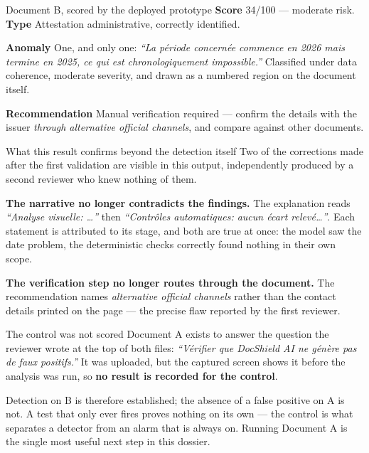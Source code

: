 \documentclass[10pt,a4paper]{article}
\newcommand{\heading}[2]{%
  \par\vspace{8pt}{\color{navy}\bfseries #1\hspace{6pt}#2}\par\vspace{-3pt}}
\newcommand{\fld}[1]{\textbf{\color{navy}#1}\hspace{5pt}}
\begin{document}
\newpage
\heading{4.2}{The result --- the planted defect was caught}

\vspace{2pt}
\begin{goodbox}{Document B, scored by the deployed prototype}
\fld{Score} 34/100 --- moderate risk. \fld{Type} Attestation administrative,
correctly identified.

\vspace{3pt}
\fld{Anomaly} One, and only one: \emph{``La période concernée commence en 2026
mais termine en 2025, ce qui est chronologiquement impossible.''} Classified
under data coherence, moderate severity, and drawn as a numbered region on the
document itself.

\vspace{3pt}
\fld{Recommendation} Manual verification required --- confirm the details with
the issuer \emph{through alternative official channels}, and compare against
other documents.
\end{goodbox}

\vspace{4pt}
\begin{note}{What this result confirms beyond the detection itself}
Two of the corrections made after the first validation are visible in this
output, independently produced by a second reviewer who knew nothing of them.

\vspace{3pt}
\textbf{The narrative no longer contradicts the findings.} The explanation reads
\emph{``Analyse visuelle: …''} then \emph{``Contrôles automatiques: aucun écart
relevé…''}. Each statement is attributed to its stage, and both are true at
once: the model saw the date problem, the deterministic checks correctly found
nothing in their own scope.

\vspace{3pt}
\textbf{The verification step no longer routes through the document.} The
recommendation names \emph{alternative official channels} rather than the
contact details printed on the page --- the precise flaw reported by the first
reviewer.
\end{note}

\vspace{4pt}
\begin{badbox}{The control was not scored}
Document A exists to answer the question the reviewer wrote at the top of both
files: \emph{``Vérifier que DocShield AI ne génère pas de faux positifs.''}
It was uploaded, but the captured screen shows it before the analysis was run,
so \textbf{no result is recorded for the control}.

\vspace{3pt}
Detection on B is therefore established; the absence of a false positive on A is
not. A test that only ever fires proves nothing on its own --- the control is
what separates a detector from an alarm that is always on. Running Document A is
the single most useful next step in this dossier.
\end{badbox}
\end{document}
